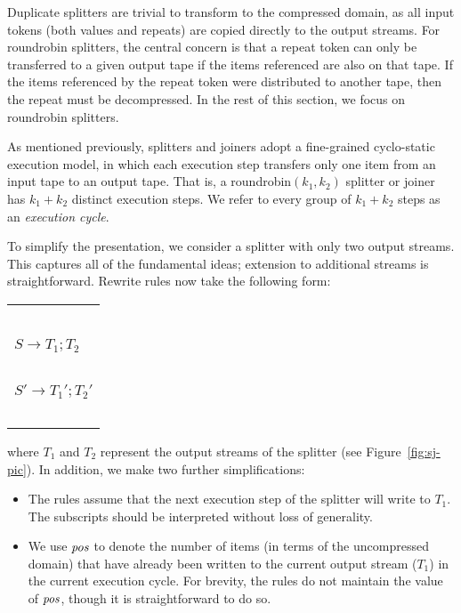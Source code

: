 Duplicate splitters are trivial to transform to the compressed domain,
as all input tokens (both values and repeats) are copied directly to
the output streams.  For roundrobin splitters, the central concern is
that a repeat token can only be transferred to a given output tape if
the items referenced are also on that tape.  If the items referenced
by the repeat token were distributed to another tape, then the repeat
must be decompressed.  In the rest of this section, we focus on
roundrobin splitters.

As mentioned previously, splitters and joiners adopt a fine-grained
cyclo-static execution model, in which each execution step transfers
only one item from an input tape to an output tape.  That is, a
roundrobin$(k_1, k_2)$ splitter or joiner has $k_1 + k_2$ distinct
execution steps.  We refer to every group of $k_1 + k_2$ steps as an
{\it execution cycle}.

To simplify the presentation, we consider a splitter with only two
output streams.  This captures all of the fundamental ideas; extension
to additional streams is straightforward.  Rewrite rules now take the
following form:

\hspace{-12pt}\begin{tabular}{l} ~ \vspace{-6pt} \\ 
\hspace{-3pt}$S \rightarrow T_1; T_2$ \hspace{-7pt}~\vspace{0.5pt} \\ \hline ~ \vspace{-7.5pt} \\
\hspace{-3pt}$S' \rightarrow T_1'; T_2'$ \hspace{-7pt} \\ ~ \vspace{-6pt} \\
\end{tabular}

\noindent where $T_1$ and $T_2$ represent the output streams of the
splitter (see Figure~\ref{fig:sj-pic}).  In addition, we make two
further simplifications:
\begin{itemize}

\item The rules assume that the next execution step of the splitter
  will write to $T_1$.  The subscripts should be interpreted without
  loss of generality.

\item We use $\mbox{\it pos}$ to denote the number of items (in terms of the
  uncompressed domain) that have already been written to the current
  output stream ($T_1$) in the current execution cycle.  For brevity,
  the rules do not maintain the value of $\mbox{\it pos}$, though it is
  straightforward to do so.

\end{itemize}


